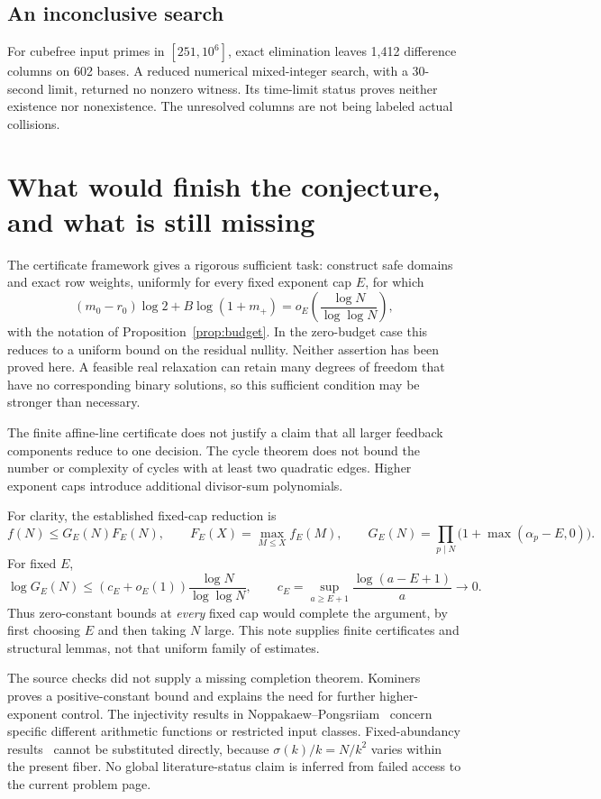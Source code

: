 \documentclass[11pt]{article}
\begin{document}
\subsection*{An inconclusive search}
For cubefree input primes in $[251,10^6]$, exact elimination leaves 1,412 difference columns on 602 bases. A reduced numerical mixed-integer search, with a 30-second limit, returned no nonzero witness. Its time-limit status proves neither existence nor nonexistence. The unresolved columns are not being labeled actual collisions.

\section{What would finish the conjecture, and what is still missing}
The certificate framework gives a rigorous sufficient task: construct safe domains and exact row weights, uniformly for every fixed exponent cap $E$, for which
\[
 (m_0-r_0)\log2+B\log(1+m_+)
 =o_E\!\left(\frac{\log N}{\log\log N}\right),
\]
with the notation of Proposition~\ref{prop:budget}. In the zero-budget case this reduces to a uniform bound on the residual nullity. Neither assertion has been proved here. A feasible real relaxation can retain many degrees of freedom that have no corresponding binary solutions, so this sufficient condition may be stronger than necessary.

The finite affine-line certificate does not justify a claim that all larger feedback components reduce to one decision. The cycle theorem does not bound the number or complexity of cycles with at least two quadratic edges. Higher exponent caps introduce additional divisor-sum polynomials.

For clarity, the established fixed-cap reduction is
\[
 f(N)\le G_E(N)F_E(N),\qquad
 F_E(X)=\max_{M\le X}f_E(M),\qquad
 G_E(N)=\prod_{p\mid N}\bigl(1+\max(\alpha_p-E,0)\bigr).
\]
For fixed $E$,
\[
 \log G_E(N)\le(c_E+o_E(1))\frac{\log N}{\log\log N},\qquad
 c_E=\sup_{a\ge E+1}\frac{\log(a-E+1)}a\longrightarrow0.
\]
Thus zero-constant bounds at \emph{every} fixed cap would complete the argument, by first choosing $E$ and then taking $N$ large. This note supplies finite certificates and structural lemmas, not that uniform family of estimates.

The source checks did not supply a missing completion theorem. Kominers~\cite{kominers} proves a positive-constant bound and explains the need for further higher-exponent control. The injectivity results in Noppakaew--Pongsriiam~\cite{np} concern specific different arithmetic functions or restricted input classes. Fixed-abundancy results~\cite{pp} cannot be substituted directly, because $\sigma(k)/k=N/k^2$ varies within the present fiber. No global literature-status claim is inferred from failed access to the current problem page.
\end{document}
